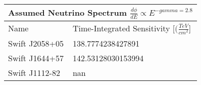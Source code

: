 \documentclass[]{article}
\begin{document}
\begin{tabular}{ |p{3.5cm}||p{4.5cm}|} 
\hline 
\multicolumn{2}{|c|}{Assumed Neutrino Spectrum $ \frac {d \phi}{dE} \propto E ^ {-gamma=2.8} $} \\ 
\hline 
Name&Time-Integrated Sensitivity [$ (\frac{TeV}{cm^{2}} $] \\ 
\hline 
Swift J2058+05 & \num[round-precision=2, round-mode=figures, scientific-notation=true]{138.7774238427891}  \\ 
Swift J1644+57 & \num[round-precision=2, round-mode=figures, scientific-notation=true]{142.53128030153994}  \\ 
Swift J1112-82 & \num[round-precision=2, round-mode=figures, scientific-notation=true]{nan}  \\ 
\hline 
\end{tabular} 
\end{document}
